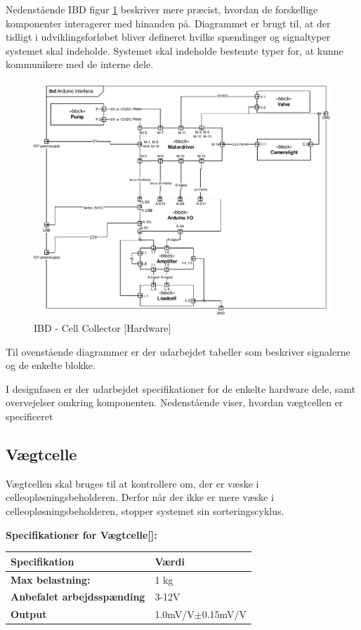 Nedenstående IBD figur \ref{fig:ibd_Hardware} beskriver mere præcist, hvordan de forskellige komponenter interagerer med hinanden på. Diagrammet er brugt til, at der tidligt i udviklingsforløbet bliver defineret hvilke spændinger og signaltyper systemet skal indeholde. Systemet skal indeholde bestemte typer for, at kunne kommunikere med de interne dele.


\begin{figure}[H]
	\centering
	\includegraphics[width=1\textwidth]{pdf/IBD_Hardware(Arduino).pdf}
	\caption{IBD - Cell Collector [Hardware]}
	\label{fig:ibd_Hardware}
\end{figure}

Til ovenstående diagrammer er der udarbejdet tabeller som beskriver signalerne og de enkelte blokke. 

I designfasen er der udarbejdet specifikationer for de enkelte hardware dele, samt overvejelser omkring komponenten. Nedenstående viser, hvordan vægtcellen er specificeret
\subsection{Vægtcelle}
\label{subsec:loadcell}
Vægtcellen skal bruges til at kontrollere om, der er væske i celleopløsningsbeholderen. Derfor når der ikke er mere væske i celleopløsningsbeholderen, stopper systemet sin sorteringscyklus.

\textbf{Specifikationer for Vægtcelle[\citet{DH7}]:} 
\begin{center}
		\begin{longtable}{ | m{6.5cm} | m{6.5cm}| } 
			\hline
			\textbf{Specifikation} &\textbf{Værdi} \\ 
			\hline
			\textbf{Max belastning:} & 1 kg \\ 
			\hline
			\textbf{Anbefalet arbejdsspænding} & 3-12V \\ 
			\hline
			\textbf{Output} & 1.0mV/V$\pm$0.15mV/V \\ 
			\hline
		\end{longtable}
\end{center}

